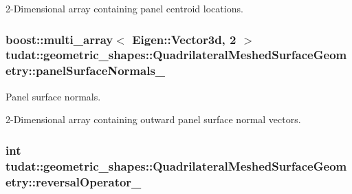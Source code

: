 2-\/\+Dimensional array containing panel centroid locations. 
\subsubsection[{\texorpdfstring{panel\+Surface\+Normals\+\_\+}{panelSurfaceNormals_}}]{\setlength{\rightskip}{0pt plus 5cm}boost\+::multi\+\_\+array$<$ Eigen\+::\+Vector3d, 2 $>$ tudat\+::geometric\+\_\+shapes\+::\+Quadrilateral\+Meshed\+Surface\+Geometry\+::panel\+Surface\+Normals\+\_\+\hspace{0.3cm}{\ttfamily [protected]}}\hypertarget{classtudat_1_1geometric__shapes_1_1QuadrilateralMeshedSurfaceGeometry_ad4ce6acf3444f33b85e4835d9288bf26}{}\label{classtudat_1_1geometric__shapes_1_1QuadrilateralMeshedSurfaceGeometry_ad4ce6acf3444f33b85e4835d9288bf26}


Panel surface normals. 

2-\/\+Dimensional array containing outward panel surface normal vectors. 
\subsubsection[{\texorpdfstring{reversal\+Operator\+\_\+}{reversalOperator_}}]{\setlength{\rightskip}{0pt plus 5cm}int tudat\+::geometric\+\_\+shapes\+::\+Quadrilateral\+Meshed\+Surface\+Geometry\+::reversal\+Operator\+\_\+\hspace{0.3cm}{\ttfamily [protected]}}\hypertarget{classtudat_1_1geometric__shapes_1_1QuadrilateralMeshedSurfaceGeometry_ac5de108458e15b4f1884c6e3ad2a1043}{}\label{classtudat_1_1geometric__shapes_1_1QuadrilateralMeshedSurfaceGeometry_ac5de108458e15b4f1884c6e3ad2a1043}


